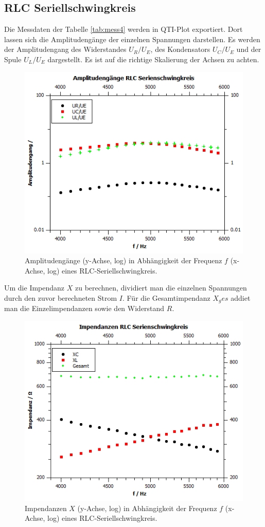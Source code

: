 \documentclass[12pt,a4paper,twoside]{article}
\begin{document}
\subsection{RLC Seriellschwingkreis}
Die Messdaten der Tabelle \ref{tab:mess4} werden in QTI-Plot exportiert. 
Dort lassen sich die Amplitudengänge der einzelnen Spannungen darstellen. 
Es werden der Amplitudengang des Widerstandes $U_R/U_E$, des Kondensators $U_C/U_E$ und der Spule $U_L/U_E$ dargestellt. 
Es ist auf die richtige Skalierung der Achsen zu achten. 
\begin{figure}[H]
    \centering
    \includegraphics[width=0.6\linewidth]{nudes/Plot a4 amp.jpg}
    \caption{Amplitudengänge (y-Achse, log) in Abhängigkeit der Frequenz $f$ (x-Achse, log) eines RLC-Seriellschwingkreis. }
    \label{fig:plot a4 amp} 
\end{figure}

\noindent
Um die Impendanz $X$ zu berechnen, dividiert man die einzelnen Spannungen durch den zuvor berechneten Strom $I$. 
Für die Gesamtimpendanz $X_ges$ addiet man die Einzelimpendanzen sowie den Widerstand $R$. 

\begin{figure}[H]
    \centering
    \includegraphics[width=0.6\linewidth]{nudes/Plot a4 imp.jpg}
    \caption{Impendanzen $X$ (y-Achse, log) in Abhängigkeit der Frequenz $f$ (x-Achse, log) eines RLC-Seriellschwingkreis. }
    \label{fig:plot a4 imp} 
\end{figure}
\end{document}
